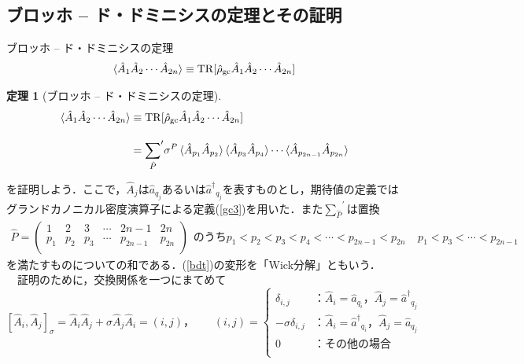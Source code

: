\documentclass[12pt]{jsarticle}\usepackage{ifthen}\newboolean{enlarge}\setboolean{enlarge}{false}
\newtheorem{theorem}{定理}
\newcommand{\be}{\begin{equation}}
\newcommand{\ee}{\end{equation}}
\newcommand{\nn}{\nonumber \\}
\newcommand{\hA}{{\hat{A}}}
\newcommand{\ha}{{\hat{a}}}
\newcommand{\had}{{\hat{a}^\dag}}
\newcommand{\hrhog}{{\hat{\rho}_{\rm{gc}}}}
\begin{document}
\subsection{ブロッホ -- ド・ドミニシスの定理とその証明}
  \begin{itembox}[l]{ブロッホ -- ド・ドミニシスの定理}
\begin{align}
\braket{\hA_1\hA_2\cdots\hA_{2n}}\equiv
{\rm{TR}}[\hrhog\hA_1\hA_2\cdots\hA_{2n}]
\end{align}
  \end{itembox}
  \begin{screen}
  \begin{theorem}[ブロッホ -- ド・ドミニシスの定理]
\begin{align}\label{bdt}
\braket{\hA_1\hA_2\cdots\hA_{2n}}&\equiv
{\rm{TR}}[\hrhog\hA_1\hA_2\cdots\hA_{2n}]\nn[10pt]
&={\displaystyle\sum_{\hat{P}}}^\prime\sigma^P\braket{\hA_{p_1}\hA_{p_2}}\braket{\hA_{p_3}\hA_{p_4}}\cdots\braket{\hA_{p_{2n-1}}\hA_{p_{2n}}}
\end{align}
  \end{theorem}
  \end{screen}
を証明しよう．ここで，$\hA_j$は$\ha_{q_j}$あるいは$\had_{q_j}$を表すものとし，期待値の定義ではグランドカノニカル密度演算子による定義(\ref{gc3})を用いた．また${\displaystyle\sum_{\hat{P}}}^\prime$は置換
\begin{subequations}
%
\begin{align}\label{bd1}
\hat{P}=
\left( 
\begin{array}{rrrrrr} 
1 & 2& 3& \cdots& 2n-1&2n\\[5pt] 
p_1 & p_2&p_3& \cdots& p_{2n-1}&p_{2n}\\ 
\end{array} 
\right)
  \end{align}
  のうち
%
\be\label{bd2}
p_1<p_2<p_3<p_4<\cdots<p_{2n-1}<p_{2n} \ \ \ \ \ p_1<p_3<\cdots<p_{2n-1}
\ee
\end{subequations}
を満たすものについての和である．(\ref{bdt})の変形を「Wick分解」ともいう．\\
　証明のために，交換関係を一つにまてめて
　\begin{equation}\label{bd3}
    [\hA_i,\hA_j]_{\sigma}=\hA_i\hA_j+\sigma\hA_j\hA_i=(i,j)，\ \ \ \ \ \ \ \ (i,j)
  = \begin{cases}
      \delta_{i,j}  &：\hA_i=\ha_{q_i}，\hA_j=\had_{q_j} \\[5pt]
      -\sigma\delta_{i,j} &：\hA_i=\had_{q_i}，\hA_j=\ha_{q_j}\\[5pt]
      0 & ：\text{その他の場合}\\[5pt]
    \end{cases}
\end{equation}
\end{document}
